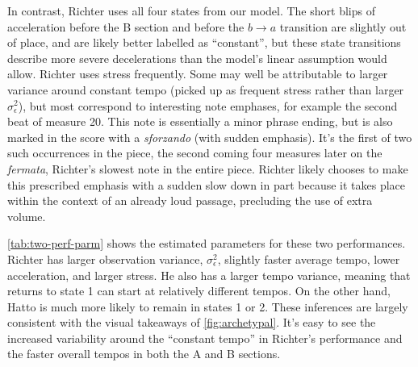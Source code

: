 \documentclass[12pt]{article}
\begin{document}
In contrast, Richter uses all four states from our model. The short
blips of acceleration before the B section and before the
$b \rightarrow a$ transition are slightly out of place, and are
likely better labelled as ``constant'', but these state transitions
describe more severe decelerations than the model's linear
assumption would allow. Richter uses stress frequently. Some may well be
attributable to larger variance around constant tempo (picked up as
frequent stress rather than larger $\sigma^2_\epsilon$), but most
correspond to interesting note emphases, for example the second beat
of measure 20. This note is essentially a minor phrase ending, but is
also marked in the score with a {\em sforzando} (with sudden
emphasis). It's the first of two such occurrences in the piece, the
second coming four measures later on the {\em fermata}, Richter's slowest
note in the entire piece. Richter likely chooses to make this
prescribed emphasis with a sudden slow down in part because it takes
place within the context of an already loud passage, precluding the
use of extra volume.
\begin{table}[tb]
  \centering
  \caption{The estimated parameters for performances by Richter and
    Hatto.}
\label{tab:two-perf-parm}
\end{table}
\autoref{tab:two-perf-parm} shows the estimated parameters for these
two performances. Richter has larger observation variance,
$\sigma^2_{\epsilon}$, slightly faster average tempo, lower
acceleration, and larger stress. He also has a larger tempo variance,
meaning that returns to state 1 can start at relatively different
tempos. On the other hand, Hatto is much more
likely to remain in states 1 or 2. These inferences are largely
consistent with the visual takeaways of \autoref{fig:archetypal}. It's
easy to see the increased variability around the ``constant tempo'' in
Richter's performance and the faster overall tempos in both the A and
B sections.
\end{document}
